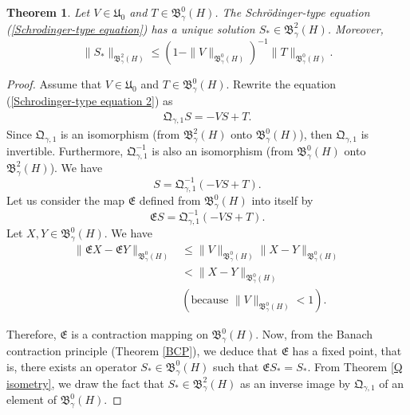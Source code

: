 \documentclass[11pt,a4paper]{amsart}
\newtheorem{theorem}{Theorem}[section]
\begin{document}
\begin{theorem}
Let $V\in \mathfrak{U}_0$ and $T\in \mathfrak{B}_\gamma^{0}(H)$. The  Schr\"odinger-type equation (\ref{Schrodinger-type equation}) has a unique solution $S_*\in \mathfrak{B}_\gamma^{2}(H)$. Moreover,
\begin{equation}
\|S_*\|_{\mathfrak{B}_\gamma^{2}(H)}\leq (1-\|V\|_{\mathfrak{B}_\gamma^{0}(H)})^{-1}\|T\|_{\mathfrak{B}_\gamma^{0}(H)}.
\end{equation} 
\end{theorem}
\begin{proof}
Assume that $V\in \mathfrak{U}_0$ and $T\in \mathfrak{B}_\gamma^{0}(H)$. 
Rewrite  the equation (\ref{Schrodinger-type equation 2}) as 
\begin{align*}
\mathfrak{Q}_{\gamma,1}S= -VS+T.
\end{align*}
Since $\mathfrak{Q}_{\gamma,1}$ is an isomorphism (from $\mathfrak{B}_\gamma^{2}(H)$ onto $\mathfrak{B}_\gamma^{0}(H)$), then  $\mathfrak{Q}_{\gamma,1}$ is invertible. Furthermore,   $\mathfrak{Q}_{\gamma,1}^{-1}$ is also an isomorphism (from $\mathfrak{B}_\gamma^{0}(H)$ onto $\mathfrak{B}_\gamma^{2}(H)$).  
We have 
$$S=\mathfrak{Q}_{\gamma,1}^{-1}(-VS+T).$$
Let us consider the map $\mathfrak{E}$ defined from $\mathfrak{B}_\gamma^{0}(H)$ into itself by
\begin{equation}
\mathfrak{E}S=\mathfrak{Q}_{\gamma,1}^{-1}(-VS+T).
\end{equation}
Let $X,Y\in \mathfrak{B}_\gamma^{0}(H)$. We have
\begin{align*}
\|\mathfrak{E}X-\mathfrak{E}Y\|_{\mathfrak{B}_\gamma^{0}(H)}&\leq \|V\|_{\mathfrak{B}_\gamma^{0}(H)}\|X-Y\|_{\mathfrak{B}_\gamma^{0}(H)}\\
&<\|X-Y\|_{\mathfrak{B}_\gamma^{0}(H)}\\
&(\mbox{because } \|V\|_{\mathfrak{B}_\gamma^{0}(H)}<1).
\end{align*}

Therefore,  $\mathfrak{E}$ is a contraction mapping on $\mathfrak{B}_\gamma^{0}(H)$. Now, from  the Banach contraction principle (Theorem \ref{BCP}), we deduce that $\mathfrak{E}$ has a fixed point, that is, there exists an operator $S_*\in \mathfrak{B}_\gamma^{0}(H)$ such that $\mathfrak{E}S_*=S_*$. From Theorem \ref{Q isometry}, we draw the fact that $S_*\in \mathfrak{B}_\gamma^{2}(H)$ as an inverse image by $\mathfrak{Q}_{\gamma,1}$  of an element of $\mathfrak{B}_\gamma^{0}(H)$. 


\end{proof}
\end{document}
